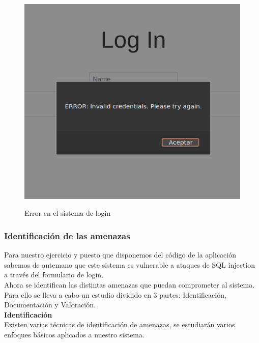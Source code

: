 \documentclass[a4paper,oneside]{article}
\begin{document}
\begin{figure}[h!]
  \centering
  \includegraphics[scale=0.6]{images/fail.png}\\
  \caption{Error en el sistema de login}
  \label{fig:fail}
\end{figure}

\subsubsection{Identificación de las amenazas}
Para nuestro ejercicio y puesto que disponemos del código de la aplicación sabemos de antemano que este sistema es vulnerable a ataques de SQL injection a través del formulario de login.\\

Ahora se identifican las distintas amenazas que puedan comprometer al sistema. Para ello se lleva a cabo un estudio dividido en 3 partes: Identificación, Documentación y Valoración.\\

\textbf{Identificación}\\
Existen varias técnicas de identificación de amenazas, se estudiarán varios enfoques básicos aplicados a nuestro sistema.
\end{document}
